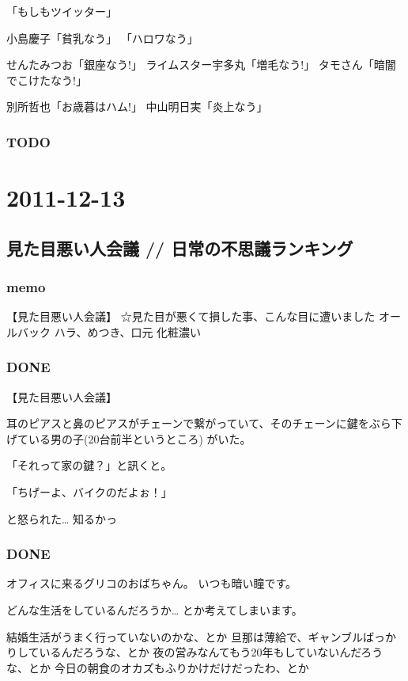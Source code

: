 \documentclass[11pt]{article}
\begin{document}
「もしもツイッター」

小島慶子「貧乳なう」
「ハロワなう」

せんたみつお「銀座なう!」
ライムスター宇多丸「増毛なう!」
タモさん「暗闇でこけたなう!」

別所哲也「お歳暮はハム!」
中山明日実「炎上なう」
\subsubsection{\textbf{TODO}}
\label{sec-21_1_3}
\section{2011-12-13}
\label{sec-22}
\subsection{見た目悪い人会議 // 日常の不思議ランキング}
\label{sec-22_1}
\subsubsection{memo}
\label{sec-22_1_1}

【見た目悪い人会議】
☆見た目が悪くて損した事、こんな目に遭いました
オールバック
ハラ、めつき、口元
化粧濃い
\subsubsection{\textbf{DONE}}
\label{sec-22_1_2}

【見た目悪い人会議】

耳のピアスと鼻のピアスがチェーンで繋がっていて、そのチェーンに鍵をぶら下げている男の子(20台前半というところ) がいた。

「それって家の鍵？」と訊くと。

「ちげーよ、バイクのだよぉ！」

と怒られた… 知るかっ
\subsubsection{\textbf{DONE}}
\label{sec-22_1_3}

オフィスに来るグリコのおばちゃん。
いつも暗い瞳です。

どんな生活をしているんだろうか… とか考えてしまいます。

結婚生活がうまく行っていないのかな、とか
旦那は薄給で、ギャンブルばっかりしているんだろうな、とか
夜の営みなんてもう20年もしていないんだろうな、とか
今日の朝食のオカズもふりかけだけだったわ、とか
\end{document}
